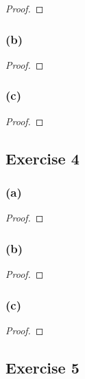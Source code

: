\documentclass[14pt]{extarticle}
\begin{document}
\begin{proof}

\end{proof}

\subsubsection{(b)}

\begin{proof}

\end{proof}

\subsubsection{(c)}

\begin{proof}

\end{proof}

\subsection{Exercise 4}

\subsubsection{(a)}

\begin{proof}

\end{proof}

\subsubsection{(b)}

\begin{proof}

\end{proof}

\subsubsection{(c)}

\begin{proof}

\end{proof}

\subsection{Exercise 5}
\end{document}
